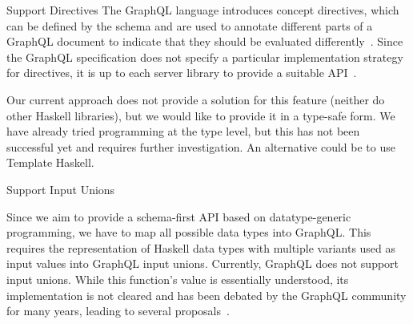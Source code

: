 \begin{frame}
\begin{block}{Support Directives}
The GraphQL language introduces concept directives, which can be defined by the schema and are used to annotate different parts of a GraphQL document to indicate that they should be evaluated differently~\cite{gql-spec}. Since the GraphQL specification does not specify a particular implementation strategy for directives, it is up to each server library to provide a suitable API~\cite{schema-directives}.

Our current approach does not provide a solution for this feature (neither do other Haskell libraries), but we would like to provide it in a type-safe form. We have already tried programming at the type level, but this has not been successful yet and requires further investigation. An alternative could be to use Template Haskell. 

\end{block}

\begin{block}{Support Input Unions} 

Since we aim to provide a schema-first API based on datatype-generic programming, we have to map all possible data types into GraphQL. This requires the representation of Haskell data types with multiple variants used as input values into GraphQL input unions. Currently, GraphQL does not support input unions. While this function's value is essentially understood, its implementation is not cleared and has been debated by the GraphQL community for many years, leading to several proposals~\cite{gql-spec-input-unions}. 

\end{block}

\end{frame}
